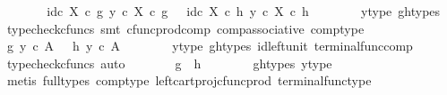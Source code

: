 \begin{isabellebody}
\ \ \ \ \isamarkupfalse%
\ \isamarkupfalse%
\ {\isachardoublequoteopen}{\isasymlangle}id\isactrlsub c\ X\ {\isasymcirc}\isactrlsub c\ g{\isacharcomma}{\kern0pt}\ y\ {\isasymcirc}\isactrlsub c\ {\isasymbeta}\isactrlbsub X\isactrlesub \ {\isasymcirc}\isactrlsub c\ g{\isasymrangle}\ \ {\isacharequal}{\kern0pt}\ {\isasymlangle}id\isactrlsub c\ X\ {\isasymcirc}\isactrlsub c\ h{\isacharcomma}{\kern0pt}\ y\ {\isasymcirc}\isactrlsub c\ {\isasymbeta}\isactrlbsub X\isactrlesub \ {\isasymcirc}\isactrlsub c\ h{\isasymrangle}{\isachardoublequoteclose}\isanewline
\ \ \ \ \ \ \isamarkupfalse%
\ y{\isacharunderscore}{\kern0pt}type\ g{\isacharunderscore}{\kern0pt}h{\isacharunderscore}{\kern0pt}types\ \isamarkupfalse%
\ {\isacharparenleft}{\kern0pt}typecheck{\isacharunderscore}{\kern0pt}cfuncs{\isacharcomma}{\kern0pt}\ smt\ cfunc{\isacharunderscore}{\kern0pt}prod{\isacharunderscore}{\kern0pt}comp\ comp{\isacharunderscore}{\kern0pt}associative{}\ comp{\isacharunderscore}{\kern0pt}type{\isacharparenright}{\kern0pt}\isanewline
\ \ \ \ \isamarkupfalse%
\ \isamarkupfalse%
\ {\isachardoublequoteopen}{\isasymlangle}g{\isacharcomma}{\kern0pt}\ y\ {\isasymcirc}\isactrlsub c\ {\isasymbeta}\isactrlbsub A\isactrlesub {\isasymrangle}\ \ {\isacharequal}{\kern0pt}\ {\isasymlangle}h{\isacharcomma}{\kern0pt}\ y\ {\isasymcirc}\isactrlsub c\ {\isasymbeta}\isactrlbsub A\isactrlesub {\isasymrangle}{\isachardoublequoteclose}\isanewline
\ \ \ \ \ \ \isamarkupfalse%
\ y{\isacharunderscore}{\kern0pt}type\ g{\isacharunderscore}{\kern0pt}h{\isacharunderscore}{\kern0pt}types\ id{\isacharunderscore}{\kern0pt}left{\isacharunderscore}{\kern0pt}unit{}\ terminal{\isacharunderscore}{\kern0pt}func{\isacharunderscore}{\kern0pt}comp\ \isamarkupfalse%
\ {\isacharparenleft}{\kern0pt}typecheck{\isacharunderscore}{\kern0pt}cfuncs{\isacharcomma}{\kern0pt}\ auto{\isacharparenright}{\kern0pt}\isanewline
\ \ \ \ \isamarkupfalse%
\ \isamarkupfalse%
\ {\isachardoublequoteopen}g\ {\isacharequal}{\kern0pt}\ h{\isachardoublequoteclose}\isanewline
\ \ \ \ \ \ \isamarkupfalse%
\ g{\isacharunderscore}{\kern0pt}h{\isacharunderscore}{\kern0pt}types\ y{\isacharunderscore}{\kern0pt}type\isanewline
\ \ \ \ \ \ \isamarkupfalse%
\ {\isacharparenleft}{\kern0pt}metis\ {\isacharparenleft}{\kern0pt}full{\isacharunderscore}{\kern0pt}types{\isacharparenright}{\kern0pt}\ comp{\isacharunderscore}{\kern0pt}type\ left{\isacharunderscore}{\kern0pt}cart{\isacharunderscore}{\kern0pt}proj{\isacharunderscore}{\kern0pt}cfunc{\isacharunderscore}{\kern0pt}prod\ terminal{\isacharunderscore}{\kern0pt}func{\isacharunderscore}{\kern0pt}type{\isacharparenright}{\kern0pt}\isanewline

\end{isabellebody}

